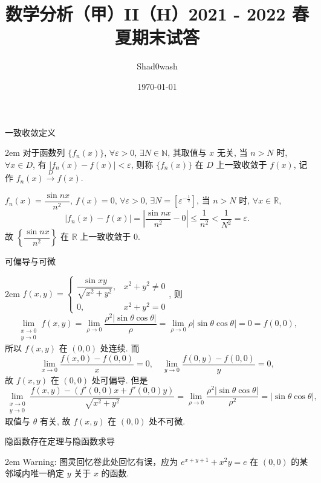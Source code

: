 \documentclass[UTF8,14pt,normal]{ctexart}
\title{数学分析（甲）II（H）2021 - 2022 春夏期末试答}
\author{Shad0wash}
\date{\today}
\begin{document}
\maketitle

 一致收敛定义

    \hangindent 2em
    \noindent
    对于函数列 \(\{f_n(x)\}\), \(\forall \varepsilon > 0\), \(\exists N \in \mathbb{N}\), 其取值与 \(x\) 无关, 当 \(n > N\) 时, \(\forall x \in D\), 有 \(\lvert f_n(x) - f(x) \rvert < \varepsilon\), 则称 \(\{f_n(x)\}\) 在 \(D\) 上一致收敛于 \(f(x)\), 记作 \(f_n(x) \xrightarrow{D} f(x)\).

    \(f_n(x) = \dfrac{\sin nx}{n^2}\), \(f(x) = 0\), \(\forall \varepsilon > 0\), \(\exists N = \left[ \varepsilon^{-\frac{1}{2}} \right]\), 当 \(n > N\) 时, \(\forall x \in \mathbb{R}\),
    \[
        \lvert f_n(x) - f(x) \rvert = \left\lvert \dfrac{\sin nx}{n^2} - 0 \right\rvert \leqslant \dfrac{1}{n^2} < \dfrac{1}{N^2} = \varepsilon.
    \]
    故 \(\left\{ \dfrac{\sin nx}{n^2} \right\}\) 在 \(\mathbb{R}\) 上一致收敛于 \(0\).

 可偏导与可微

    \hangindent 2em
    \noindent
    \(f(x, y) = \begin{cases} \dfrac{\sin xy}{\sqrt{x^2 + y^2}}, & x^2 + y^2 \neq 0 \\ 0, & x^2 + y^2 = 0 \end{cases}\), 则
    \[
        \lim_{\substack{x \to 0 \\ y \to 0}} f(x, y) = \lim_{\rho \to 0} \dfrac{\rho^2 \lvert \sin \theta \cos \theta \rvert}{\rho} = \lim_{\rho \to 0} \rho \lvert \sin \theta \cos \theta \rvert = 0 = f(0, 0),
    \]
    所以 \(f(x, y)\) 在 \((0, 0)\) 处连续. 而
    \[
        \lim_{x \to 0} \dfrac{f(x, 0) - f(0, 0)}{x} = 0, \quad \lim_{y \to 0} \dfrac{f(0, y) - f(0, 0)}{y} = 0,
    \]
    故 \(f(x, y)\) 在 \((0, 0)\) 处可偏导. 但是
    \[
        \lim_{\substack{x \to 0 \\ y \to 0}} \dfrac{f(x, y) - (f'(0, 0) x + f'(0, 0) y)}{\sqrt{x^2 + y^2}} = \lim_{\rho \to 0} \dfrac{\rho^2 \lvert \sin \theta \cos \theta \rvert }{\rho^2} = \lvert \sin \theta \cos \theta \rvert,
    \]
    取值与 \(\theta\) 有关, 故 \(f(x, y)\) 在 \((0, 0)\) 处不可微.


 隐函数存在定理与隐函数求导


    \hangindent 2em
    \noindent
    Warning: 图灵回忆卷此处回忆有误，应为 \(e^{x + y + 1} + x^2y = e\) 在 \((0, 0)\) 的某邻域内唯一确定 \(y\) 关于 \(x\) 的函数.
\end{document}

